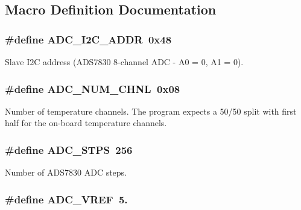 \subsection{Macro Definition Documentation}
\hypertarget{a00041_a5fd3aabe18504a5314a5d0e71e3bc495}{
\subsubsection[{A\-D\-C\-\_\-\-I2\-C\-\_\-\-A\-D\-D\-R}]{\setlength{\rightskip}{0pt plus 5cm}\#define A\-D\-C\-\_\-\-I2\-C\-\_\-\-A\-D\-D\-R~0x48}}\label{a00041_a5fd3aabe18504a5314a5d0e71e3bc495}
Slave I2\-C address (A\-D\-S7830 8-\/channel A\-D\-C -\/ A0 = 0, A1 = 0). \hypertarget{a00041_a448e8a52be570dfe9fdddb2045039534}{
\subsubsection[{A\-D\-C\-\_\-\-N\-U\-M\-\_\-\-C\-H\-N\-L}]{\setlength{\rightskip}{0pt plus 5cm}\#define A\-D\-C\-\_\-\-N\-U\-M\-\_\-\-C\-H\-N\-L~0x08}}\label{a00041_a448e8a52be570dfe9fdddb2045039534}
Number of temperature channels. The program expects a 50/50 split with first half for the on-\/board temperature channels. \hypertarget{a00041_a9be6401f8c9339711816bec5ca55dd88}{
\subsubsection[{A\-D\-C\-\_\-\-S\-T\-P\-S}]{\setlength{\rightskip}{0pt plus 5cm}\#define A\-D\-C\-\_\-\-S\-T\-P\-S~256}}\label{a00041_a9be6401f8c9339711816bec5ca55dd88}
Number of A\-D\-S7830 A\-D\-C steps. \hypertarget{a00041_a5a03d0b939a8dda552c9fe3319a82485}{
\subsubsection[{A\-D\-C\-\_\-\-V\-R\-E\-F}]{\setlength{\rightskip}{0pt plus 5cm}\#define A\-D\-C\-\_\-\-V\-R\-E\-F~5.}}\label{a00041_a5a03d0b939a8dda552c9fe3319a82485}
